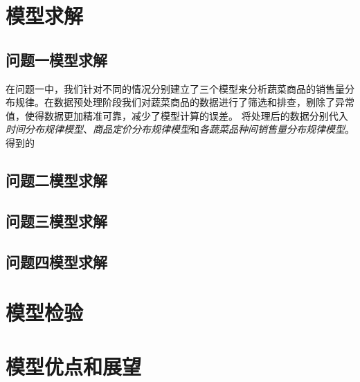 \documentclass{article}
\begin{document}
\section{模型求解}


\subsection{问题一模型求解}
在问题一中，我们针对不同的情况分别建立了三个模型来分析蔬菜商品的销售量分布规律。在数据预处理阶段我们对蔬菜商品的数据进行了筛选和排查，剔除了异常值，使得数据更加精准可靠，减少了模型计算的误差。
将处理后的数据分别代入\textit{时间分布规律模型}、\textit{商品定价分布规律模型}和\textit{各蔬菜品种间销售量分布规律模型}。
得到的%
\subsection{问题二模型求解}

\subsection{问题三模型求解}

\subsection{问题四模型求解}


\section{模型检验}

\section{模型优点和展望}
\end{document}
